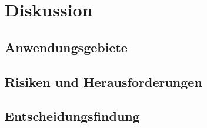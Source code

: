 \section{Diskussion}
\label{sec:diskussion}

\subsection{Anwendungsgebiete}

\subsection{Risiken und Herausforderungen}

\subsection{Entscheidungsfindung}